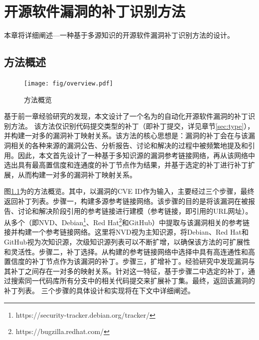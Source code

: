 
\chapter{开源软件漏洞的补丁识别方法}

本章将详细阐述\tool ---一种基于多源知识的开源软件漏洞补丁识别方法的设计。

\section{方法概述}
\begin{figure}[t]
    \centering
    \texttt{[image: fig/overview.pdf]}
    \caption{\tool 方法概览}\label{fig:overview}
\end{figure}

基于前一章经验研究的发现，本文设计了一个名为\tool 的自动化开源软件漏洞的补丁识别方法。
该方法仅识别代码提交类型的补丁（即补丁提交，详见章节\ref{sec:type}），并构建一对多的漏洞补丁映射关系。该方法的核心思想是：漏洞的补丁会在与该漏洞相关的各种来源的漏洞公告、分析报告、讨论和解决的过程中被频繁地提及和引用。因此，本文首先设计了一种基于多知识源的漏洞参考链接网络，再从该网络中选出具有最高置信度和连通度的补丁节点作为结果，并基于选定的补丁进行补丁扩展，从而构建一对多的漏洞补丁映射关系。

图\ref{fig:overview}为\tool 的方法概览。其中，\tool 以漏洞的CVE ID作为输入，主要经过三个步骤，最终返回补丁列表。步骤一，构建多源参考链接网络。该步骤的目的是将该漏洞在被报告、讨论和解决阶段引用的参考链接进行建模（参考链接，即引用的URL网址）。\tool 从多个（即NVD、Debian\footnote{https://security-tracker.debian.org/tracker/}、Red Hat\footnote{https://bugzilla.redhat.com/}和GitHub）中提取与该漏洞相关的参考链接并构建一个参考链接网络。这里将NVD视为主知识源，将Debian、Red Hat和GitHub视为次知识源，次级知识源列表可以不断扩增，以确保该方法的可扩展性和灵活性。步骤二，补丁选择。\tool 从构建的参考链接网络中选择中具有高连通性和高置信度的补丁节点作为该漏洞的补丁。步骤三，扩增补丁。经验研究中发现漏洞与其补丁之间存在一对多的映射关系。针对这一特征，基于步骤二中选定的补丁，\tool 通过搜索同一代码库所有分支中的相关代码提交来扩展补丁集。最终，\tool 返回该漏洞的补丁列表。
三个步骤的具体设计和实现将在下文中详细阐述。

